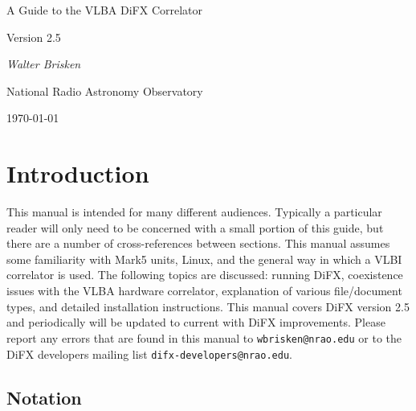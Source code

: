 \documentclass{article}
\begin{document}
\newcommand{\Oa}[1]{\hspace{-12pt}\makebox[12pt]{$\star$}#1}
\newcommand{\Da}[1]{\hspace{-12pt}\makebox[12pt]{$\times$}#1}
\newcommand{\bfit}[1]{{\textrm{\textit{\textmd{#1}}}}}


\begin{center}


{\LARGE A Guide to the VLBA DiFX Correlator}

\vspace{5pt}

{\Large Version 2.5}


\vspace{10pt}

{\it Walter Brisken}

\vspace{5pt}

National Radio Astronomy Observatory

\vspace{5pt}
\today

\end{center}

\tableofcontents

\section{Introduction}

This manual is intended for many different audiences.
Typically a particular reader will only need to be concerned with a small portion of this guide, but there are a number of cross-references between sections.
This manual assumes some familiarity with Mark5 units, Linux, and the general way in which a VLBI correlator is used.
The following topics are discussed: running DiFX, coexistence issues with the VLBA hardware correlator, explanation of various file/document types, and detailed installation instructions.
This manual covers DiFX version 2.5 and periodically will be updated to current with DiFX improvements.
Please report any errors that are found in this manual to {\tt wbrisken@nrao.edu} or to the DiFX developers mailing list {\tt difx-developers@nrao.edu}.

\subsection{Notation}
\end{document}
